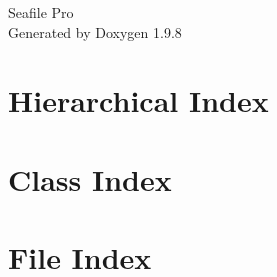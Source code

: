 \documentclass[twoside]{book}
\newcommand{\+}{\discretionary{\mbox{\scriptsize$\hookleftarrow$}}{}{}}
\newcommand{\clearemptydoublepage}{%
    \newpage{\pagestyle{empty}\cleardoublepage}%
  }
\begin{document}
  \raggedbottom
    \hypersetup{pageanchor=false,
                bookmarksnumbered=true,
                pdfencoding=unicode
               }
  \begin{titlepage}
  \vspace*{7cm}
  \begin{center}%
  {\Large Seafile Pro}\\
  \vspace*{1cm}
  {\large Generated by Doxygen 1.9.8}\\
  \end{center}
  \end{titlepage}
  \clearemptydoublepage
  \tableofcontents
  \clearemptydoublepage
  \hypersetup{pageanchor=true}
\chapter{Hierarchical Index}

\chapter{Class Index}

\chapter{File Index}

\end{document}
